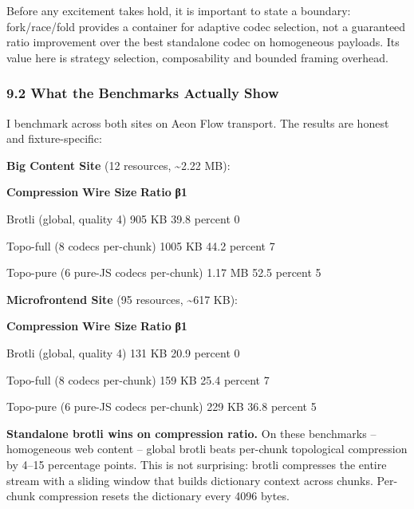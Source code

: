 \documentclass[
]{article}
\begin{document}
Before any excitement takes hold, it is important to state a boundary:
fork/race/fold provides a container for adaptive codec selection, not a
guaranteed ratio improvement over the best standalone codec on
homogeneous payloads. Its value here is strategy selection,
composability and bounded framing overhead.

\subsubsection{\texorpdfstring{\textbf{9.2 What the Benchmarks Actually
Show}}{9.2 What the Benchmarks Actually Show}}\label{what-the-benchmarks-actually-show}

I benchmark across both sites on Aeon Flow transport. The results are
honest and fixture-specific:

\textbf{Big Content Site} (12 resources, \textasciitilde2.22 MB):

\textbf{Compression} \textbar{} \textbf{Wire Size} \textbar{}
\textbf{Ratio} \textbar{} \textbf{β1\hspace{0pt}} \textbar{}

Brotli (global, quality 4) \textbar{} 905 KB \textbar{} 39.8 percent
\textbar{} 0 \textbar{}

Topo-full (8 codecs per-chunk) \textbar{} 1005 KB \textbar{} 44.2
percent \textbar{} 7 \textbar{}

Topo-pure (6 pure-JS codecs per-chunk) \textbar{} 1.17 MB \textbar{}
52.5 percent \textbar{} 5 \textbar{}

\textbf{Microfrontend Site} (95 resources, \textasciitilde617 KB):

\textbf{Compression} \textbar{} \textbf{Wire Size} \textbar{}
\textbf{Ratio} \textbar{} \textbf{β1\hspace{0pt}} \textbar{}

Brotli (global, quality 4) \textbar{} 131 KB \textbar{} 20.9 percent
\textbar{} 0 \textbar{}

Topo-full (8 codecs per-chunk) \textbar{} 159 KB \textbar{} 25.4 percent
\textbar{} 7 \textbar{}

Topo-pure (6 pure-JS codecs per-chunk) \textbar{} 229 KB \textbar{} 36.8
percent \textbar{} 5 \textbar{}

\textbf{Standalone brotli wins on compression ratio.} On these
benchmarks -- homogeneous web content -- global brotli beats per-chunk
topological compression by 4--15 percentage points. This is not
surprising: brotli compresses the entire stream with a sliding window
that builds dictionary context across chunks. Per-chunk compression
resets the dictionary every 4096 bytes.
\end{document}
